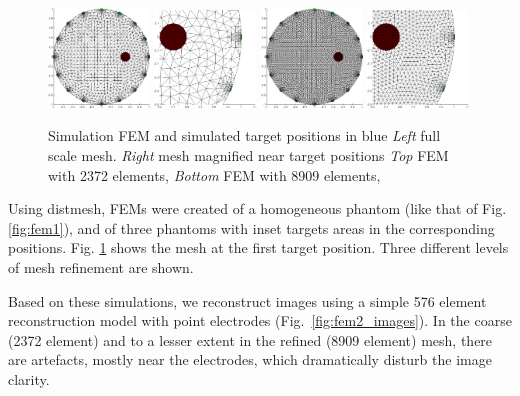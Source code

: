 \documentclass[letterpaper,twocolumn,10pt]{article}
\begin{document}
\begin{figure}[tbh]
\begin{center}
 \includegraphics[width= 0.24\textwidth]{figs/fig3a-2372e.png}
 \includegraphics[width= 0.24\textwidth]{figs/fig3b-2372e.png}
 \includegraphics[width= 0.24\textwidth]{figs/fig3a-8909e.png}
 \includegraphics[width= 0.24\textwidth]{figs/fig3b-8909e.png}
\caption{ \label{fig:fem2}
\small
Simulation FEM and simulated target positions in blue
{\em Left} full scale mesh.
{\em Right} mesh magnified near target positions 
{\em Top} FEM with 2372 elements,
{\em Bottom} FEM with 8909 elements,
}
\end{center}
\vspace{-0.5cm}
\end{figure}

Using distmesh\cite{persson2004},
 FEMs were created of a homogeneous phantom
(like that of Fig. \ref{fig:fem1}), and of three phantoms
with inset targets areas in the corresponding positions.
Fig. \ref{fig:fem2} shows the mesh at the
first target position. Three different levels of mesh
refinement are shown.

Based on these simulations, we reconstruct images
using a simple 576 element reconstruction model with point electrodes
(Fig.~\ref{fig:fem2_images}). In the coarse (2372 element)
and to a lesser extent in the refined (8909 element) 
mesh, there are artefacts, mostly near the electrodes, which
dramatically disturb the image clarity.
\end{document}
